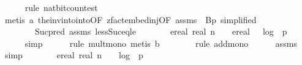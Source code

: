 \begin{isabellebody}
\ \ \ \ \isamarkupfalse%
\ {\isacharparenleft}{\kern0pt}rule\ nat{\isacharunderscore}{\kern0pt}bit{\isacharunderscore}{\kern0pt}count{\isacharunderscore}{\kern0pt}est{\isacharparenright}{\kern0pt}\isanewline
\ \ \ \ \isamarkupfalse%
\ {\isacharparenleft}{\kern0pt}metis\ a\ the{\isacharunderscore}{\kern0pt}inv{\isacharunderscore}{\kern0pt}into{\isacharunderscore}{\kern0pt}into{\isacharbrackleft}{\kern0pt}OF\ zfact{\isacharunderscore}{\kern0pt}embed{\isacharunderscore}{\kern0pt}inj{\isacharbrackleft}{\kern0pt}OF\ assms{\isacharparenleft}{\kern0pt}{}{\isacharparenright}{\kern0pt}{\isacharbrackright}{\kern0pt}{\isacharcomma}{\kern0pt}\ \ B{\isacharequal}{\kern0pt}{\isachardoublequoteopen}{\isacharbraceleft}{\kern0pt}{}{\isachardot}{\kern0pt}{\isachardot}{\kern0pt}{\isacharless}{\kern0pt}p{\isacharbraceright}{\kern0pt}{\isachardoublequoteclose}{\isacharcomma}{\kern0pt}\ simplified{\isacharbrackright}{\kern0pt}\isanewline
\ \ \ \ \ \ \ \ Suc{\isacharunderscore}{\kern0pt}pred\ assms{\isacharparenleft}{\kern0pt}{}{\isacharparenright}{\kern0pt}\ less{\isacharunderscore}{\kern0pt}Suc{\isacharunderscore}{\kern0pt}eq{\isacharunderscore}{\kern0pt}le{\isacharparenright}{\kern0pt}\isanewline
\ \ \isamarkupfalse%
\ \isamarkupfalse%
\ {\isachardoublequoteopen}{\isachardot}{\kern0pt}{\isachardot}{\kern0pt}{\isachardot}{\kern0pt}\ {\isasymle}\ ereal\ {\isacharparenleft}{\kern0pt}real\ n{\isacharparenright}{\kern0pt}\ {\isacharasterisk}{\kern0pt}\ {\isacharparenleft}{\kern0pt}{}\ {\isacharplus}{\kern0pt}\ ereal\ {\isacharparenleft}{\kern0pt}{}\ {\isacharasterisk}{\kern0pt}\ log\ {}\ p{\isacharparenright}{\kern0pt}\ {\isacharparenright}{\kern0pt}\ {\isacharplus}{\kern0pt}\ {}{\isachardoublequoteclose}\isanewline
\ \ \ \ \isamarkupfalse%
\ simp\isanewline
\ \ \ \ \isamarkupfalse%
\ {\isacharparenleft}{\kern0pt}rule\ mult{\isacharunderscore}{\kern0pt}mono{\isacharcomma}{\kern0pt}\ metis\ b{\isacharparenright}{\kern0pt}\isanewline
\ \ \ \ \ \ \isamarkupfalse%
\ {\isacharparenleft}{\kern0pt}rule\ add{\isacharunderscore}{\kern0pt}mono{\isacharparenright}{\kern0pt}\isanewline
\ \ \ \ \isamarkupfalse%
\ assms{\isacharparenleft}{\kern0pt}{}{\isacharparenright}{\kern0pt}\ \isamarkupfalse%
\ simp{\isacharplus}{\kern0pt}\isanewline
\ \ \isamarkupfalse%
\ \isamarkupfalse%
\ {\isachardoublequoteopen}{\isachardot}{\kern0pt}{\isachardot}{\kern0pt}{\isachardot}{\kern0pt}\ {\isacharequal}{\kern0pt}\ ereal\ {\isacharparenleft}{\kern0pt}real\ n\ {\isacharasterisk}{\kern0pt}\ {\isacharparenleft}{\kern0pt}{}\ {\isacharasterisk}{\kern0pt}\ log\ {}\ p\ {\isacharplus}{\kern0pt}\ {}{\isacharparenright}{\kern0pt}\ {\isacharplus}{\kern0pt}\ {}{\isacharparenright}{\kern0pt}{\isachardoublequoteclose}\isanewline

\end{isabellebody}
